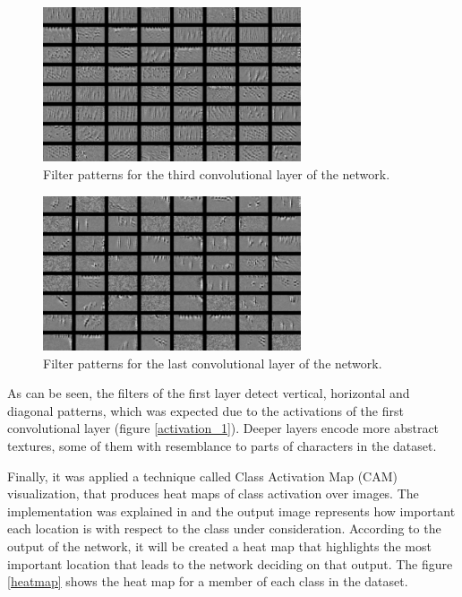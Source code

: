 \documentclass[journal]{IEEEtran}
\begin{document}
\begin{figure}[!t]
\centering
\includegraphics[width=3in]{images/conv2d_3_filter_activation.png}
\caption{Filter patterns for the third convolutional layer of the network.}
\label{third_layer_patterns}
\end{figure}

\begin{figure}[!t]
\centering
\includegraphics[width=3in]{images/conv2d_4_filter_activation.png}
\caption{Filter patterns for the last convolutional layer of the network.}
\label{fourth_layer_patterns}
\end{figure}

As can be seen, the filters of the first layer detect vertical, horizontal and diagonal patterns, which was expected due to the activations of the first convolutional layer (figure \ref{activation_1}). Deeper layers encode more abstract textures, some of them with resemblance to parts of characters in the dataset.

Finally, it was applied a technique called Class Activation Map (CAM) visualization, that produces heat maps of class activation over images. The implementation was explained in \cite{Selvaraju2017} and the output image represents how important each location is with respect to the class under consideration. According to the output of the network, it will be created a heat map that highlights the most important location that leads to the network deciding on that output. The figure \ref{heatmap} shows the heat map for a member of each class in the dataset.
\end{document}

